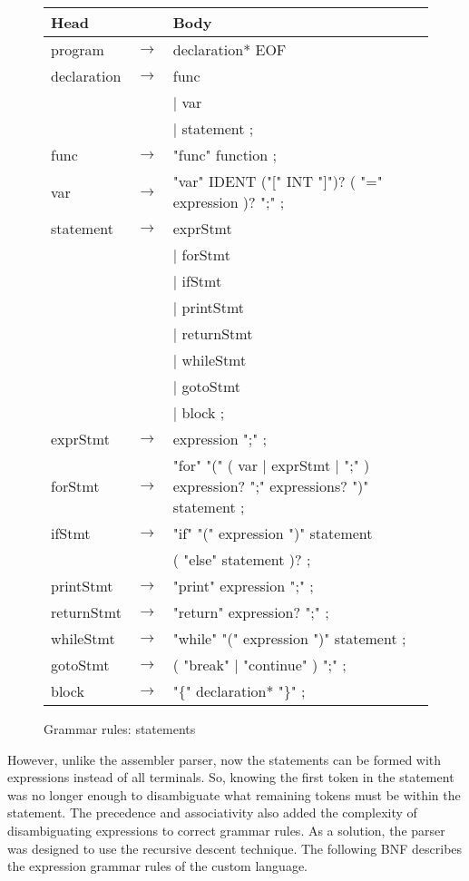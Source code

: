 \documentclass[manuscript,screen,nonacm]{acmart}
\begin{document}
\begin{figure}[H]
\begin{center}
\begin{tabular}{l l l}
    \hline
    Head & & Body \\
    \hline
    program & $\rightarrow$ & declaration* EOF \\
    declaration & $\rightarrow$ & func \\
    ~ & ~ & | var \\
    ~ & ~ & | statement ; \\
    func & $\rightarrow$ & "func" function ; \\
    var & $\rightarrow$ & "var" IDENT ("[" INT "]")? ( "=" expression )? ";" ; \\
    statement & $\rightarrow$ & exprStmt \\
    ~ & ~ & | forStmt \\
    ~ & ~ & | ifStmt \\
    ~ & ~ & | printStmt \\
    ~ & ~ & | returnStmt \\
    ~ & ~ & | whileStmt \\
    ~ & ~ & | gotoStmt \\
    ~ & ~ & | block ; \\
    exprStmt & $\rightarrow$ & expression ";" ; \\
    forStmt & $\rightarrow$ & "for" "(" ( var | exprStmt | ";" ) expression? ";" expressions? ")" statement ; \\
    ifStmt & $\rightarrow$ & "if" "(" expression ")" statement \\
    ~ & ~ & ( "else" statement )? ; \\
    printStmt & $\rightarrow$ & "print" expression ";" ; \\
    returnStmt & $\rightarrow$ & "return" expression? ";" ; \\
    whileStmt & $\rightarrow$ & "while" "(" expression ")" statement ; \\
    gotoStmt & $\rightarrow$ & ( "break" | "continue" ) ";" ; \\
    block & $\rightarrow$ & "$\{$" declaration* "$\}$" ; \\
    \hline
\end{tabular}
\end{center}
    
\caption{Grammar rules: statements} 
\label{grammar rules: statements}
\end{figure}

However, unlike the assembler parser, now the statements can be formed with expressions instead of all terminals. So, knowing the first token in the statement was no longer enough to disambiguate what remaining tokens must be within the statement. The precedence and associativity also added the complexity of disambiguating expressions to correct grammar rules. 
As a solution, the parser was designed to use the recursive descent technique. The following BNF describes the expression grammar rules of the custom language. 
\end{document}
